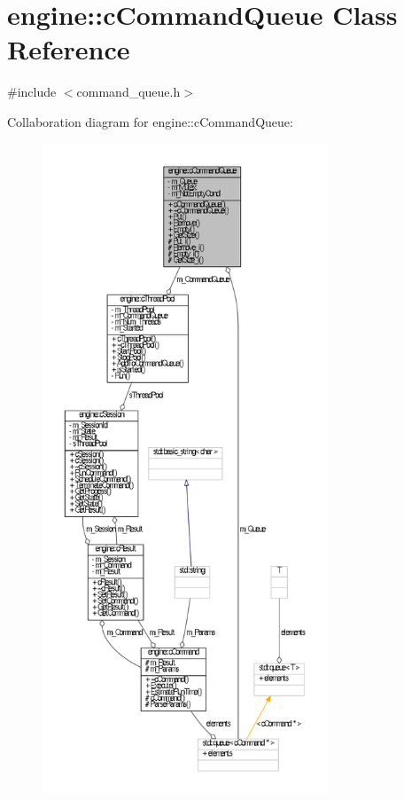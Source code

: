 \hypertarget{classengine_1_1cCommandQueue}{\section{engine\-:\-:c\-Command\-Queue \-Class \-Reference}
\label{classengine_1_1cCommandQueue}
}


{\ttfamily \#include $<$command\-\_\-queue.\-h$>$}



\-Collaboration diagram for engine\-:\-:c\-Command\-Queue\-:
\nopagebreak
\begin{figure}[H]
\begin{center}
\leavevmode
\includegraphics[height=550pt]{classengine_1_1cCommandQueue__coll__graph}
\end{center}
\end{figure}
